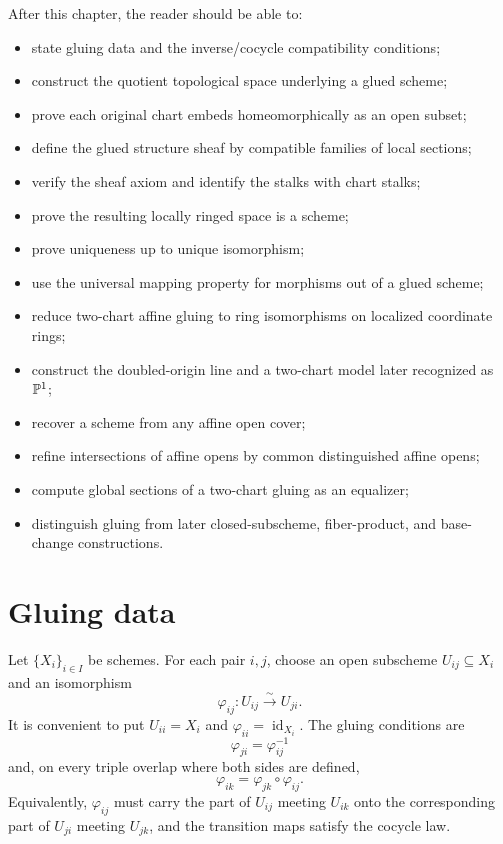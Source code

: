 After this chapter, the reader should be able to:
\begin{itemize}
\item state gluing data and the inverse/cocycle compatibility conditions;
\item construct the quotient topological space underlying a glued scheme;
\item prove each original chart embeds homeomorphically as an open subset;
\item define the glued structure sheaf by compatible families of local sections;
\item verify the sheaf axiom and identify the stalks with chart stalks;
\item prove the resulting locally ringed space is a scheme;
\item prove uniqueness up to unique isomorphism;
\item use the universal mapping property for morphisms out of a glued scheme;
\item reduce two-chart affine gluing to ring isomorphisms on localized coordinate rings;
\item construct the doubled-origin line and a two-chart model later recognized as $\mathbb P^1$;
\item recover a scheme from any affine open cover;
\item refine intersections of affine opens by common distinguished affine opens;
\item compute global sections of a two-chart gluing as an equalizer;
\item distinguish gluing from later closed-subscheme, fiber-product, and base-change constructions.
\end{itemize}



\section{Gluing data}

Let $\{X_i\}_{i\in I}$ be schemes.  For each pair $i,j$, choose an open subscheme
$U_{ij}\subseteq X_i$ and an isomorphism
\[
\varphi_{ij}:U_{ij}\xrightarrow{\sim}U_{ji}.
\]
It is convenient to put $U_{ii}=X_i$ and $\varphi_{ii}=\operatorname{id}_{X_i}$.
The gluing conditions are
\[
\varphi_{ji}=\varphi_{ij}^{-1}
\]
and, on every triple overlap where both sides are defined,
\[
\varphi_{ik}=\varphi_{jk}\circ\varphi_{ij}.
\]
Equivalently, $\varphi_{ij}$ must carry the part of $U_{ij}$ meeting $U_{ik}$ onto the
corresponding part of $U_{ji}$ meeting $U_{jk}$, and the transition maps satisfy the cocycle law.


